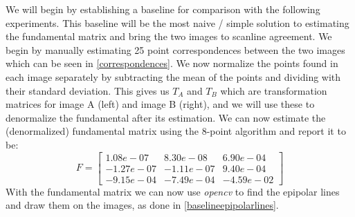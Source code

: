 We will begin by establishing a baseline for comparison with the following experiments. This baseline will be the most naive / simple solution to estimating the fundamental matrix and bring the two images to scanline agreement. We begin by manually estimating 25 point correspondences between the two images which can be seen in \autoref{correspondences}. We now normalize the points found in each image separately by subtracting the mean of the points and dividing with their standard deviation. This gives us $T_A$ and $T_B$ which are transformation matrices for image A (left) and image B (right), and we will use these to denormalize the fundamental after its estimation. We can now estimate the (denormalized) fundamental matrix using the 8-point algorithm and report it to be:
\begin{equation*}
	F = \begin{bmatrix}
		1.08e-07 & 8.30e-08 & 6.90e-04\\
		-1.27e-07 & -1.11e-07 & 9.40e-04\\
		-9.15e-04 &-7.49e-04 & -4.59e-02
	\end{bmatrix}
\end{equation*}
With the fundamental matrix we can now use \textit{opencv} to find the epipolar lines and draw them on the images, as done in \autoref{baselineepipolarlines}.
